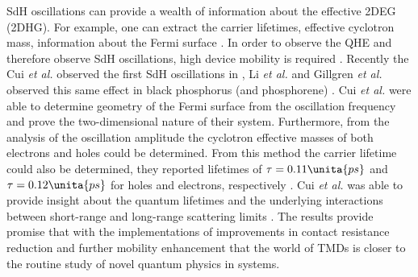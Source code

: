 \noindent \acs{SdH} oscillations can provide a wealth of information about the effective \acs{2DEG} (\acs{2DHG}). For example, one can extract the carrier lifetimes, effective cyclotron mass, information about the Fermi surface \cite{Li_NatureNano2015}. In order to observe the \acs{QHE} and therefore observe \acs{SdH} oscillations, high device mobility is required \cite{Das_Wiley1996,Tsukazak_Science2007}. Recently the Cui \emph{et al.} observed the first \acs{SdH} oscillations in , Li \emph{et al.} and Gillgren \emph{et al.} observed this same effect in black phosphorus (and phosphorene) \cite{Cui_NatureNano2015,Li_NatureNano2015,Gillgren_2DMat2015}. Cui \emph{et al.} were able to determine geometry of the Fermi surface from the oscillation frequency and prove the two-dimensional nature of their system. Furthermore, from the analysis of the oscillation amplitude the cyclotron effective masses of both electrons and holes could be determined. From this method the carrier lifetime could also be determined, they reported lifetimes of $\tau = 0.11\unita{ps}$ and $\tau = 0.12\unita{ps}$ for holes and electrons, respectively \cite{Li_NatureNano2015,Shoenberg_Magnet1984}. Cui \emph{et al.} was able to provide insight about the quantum lifetimes and the underlying interactions between short-range and long-range scattering limits \cite{Cui_NatureNano2015}. The results provide promise that with the implementations of improvements in contact resistance reduction and further mobility enhancement that the world of \acp{TMD} is closer to the routine study of novel quantum physics in \td systems. 

